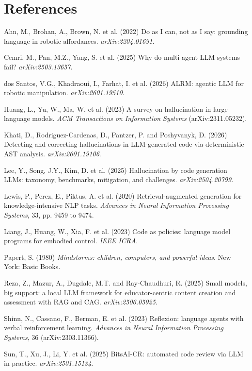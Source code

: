 \documentclass[10.5pt]{article}
\begin{document}
\section*{References}
{\small\setlength{\parindent}{0pt}\setlength{\parskip}{2pt}
Ahn, M., Brohan, A., Brown, N. et al. (2022) Do as I can, not as I say: grounding language in robotic affordances. \textit{arXiv:2204.01691}.\par
Cemri, M., Pan, M.Z., Yang, S. et al. (2025) Why do multi-agent LLM systems fail? \textit{arXiv:2503.13657}.\par
dos Santos, V.G., Khadraoui, I., Farhat, I. et al. (2026) ALRM: agentic LLM for robotic manipulation. \textit{arXiv:2601.19510}.\par
Huang, L., Yu, W., Ma, W. et al. (2023) A survey on hallucination in large language models. \textit{ACM Transactions on Information Systems} (arXiv:2311.05232).\par
Khati, D., Rodriguez-Cardenas, D., Pantzer, P. and Poshyvanyk, D. (2026) Detecting and correcting hallucinations in LLM-generated code via deterministic AST analysis. \textit{arXiv:2601.19106}.\par
Lee, Y., Song, J.Y., Kim, D. et al. (2025) Hallucination by code generation LLMs: taxonomy, benchmarks, mitigation, and challenges. \textit{arXiv:2504.20799}.\par
Lewis, P., Perez, E., Piktus, A. et al. (2020) Retrieval-augmented generation for knowledge-intensive NLP tasks. \textit{Advances in Neural Information Processing Systems}, 33, pp. 9459 to 9474.\par
Liang, J., Huang, W., Xia, F. et al. (2023) Code as policies: language model programs for embodied control. \textit{IEEE ICRA}.\par
Papert, S. (1980) \textit{Mindstorms: children, computers, and powerful ideas}. New York: Basic Books.\par
Reza, Z., Mazur, A., Dugdale, M.T. and Ray-Chaudhuri, R. (2025) Small models, big support: a local LLM framework for educator-centric content creation and assessment with RAG and CAG. \textit{arXiv:2506.05925}.\par
Shinn, N., Cassano, F., Berman, E. et al. (2023) Reflexion: language agents with verbal reinforcement learning. \textit{Advances in Neural Information Processing Systems}, 36 (arXiv:2303.11366).\par
Sun, T., Xu, J., Li, Y. et al. (2025) BitsAI-CR: automated code review via LLM in practice. \textit{arXiv:2501.15134}.\par
}
\end{document}
